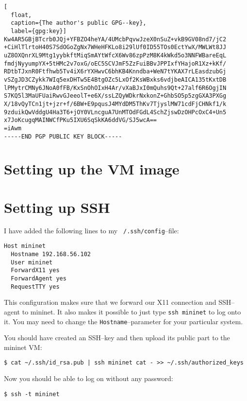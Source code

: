 \begin{lstlisting}[
  float,
  caption={The author's public GPG--key},
  label={gpg:key}]
Kw4AR5GBjBTcrb0JQj+YFBZO4heYA/4UMcbPqvwJzeX0nSuZ+vkB9GV08nd7/jC2
+CiHlTlrtoH40S7SdOGoZgNx7WHeHFKLo8i29lUf0ID55TOs0EctYwX/MWLWt8JJ
uZ8OXQnrXL9Mtg1yybkftMiqSmAYtWfcX6Wv86zpPzM8K4kWkd5o3NNFWBareEqL
fmdjNyyumpYX+5tHMc2v7oxG/oEC5SCVJmF5ZzFuiBBvJPPIxfYHajoR1Xz+kKf/
RDtbTJxnR0Ftfhwb5Tv4iX6rYXHwvC6bhKB4Knndba+WeN7tYKAX7rLEasdzubGj
vSZgJD3CZykk7WIq5exDHTw5E4BtgOZc5LxOf2KsWBxks6vdjbeAICA135tKxtDB
lPMytrCMNy6JNoA0fFB/KxSnOhOIxH4Ar/vXaBJxI0mQuhs9Qt+27alf6R6OgjIN
S7KQ5l3MaUFUaiRwvGJeeolT+e6X/ssLZQyWDkrNxkonZ+GhbSO5p5zgGXA3PXGg
X/18vQyTCn1jt+jzr+f/6BW+E9pqusJ4MYdDM5ThKv7TjyslMW71cdFjCHNkf1/k
9zduikQwVddgU4Ha3T6+jOY0VLncguA7UnMTOdFGdL4SchZjswDzOHPcOxC4+Un5
x7JoKcugqMAINWCfPKu5IXU6SqSkKA6ddVG/SJ5wcA==
=iAwm
-----END PGP PUBLIC KEY BLOCK-----
\end{lstlisting}
\clearpage %

\section{Setting up the VM image}


\section{Setting up SSH}

I have added the following lines to my \texttt{~/.ssh/config}--file:

\begin{verbatim}
Host mininet
  Hostname 192.168.56.102
  User mininet
  ForwardX11 yes
  ForwardAgent yes
  RequestTTY yes
\end{verbatim}

This configuration makes sure that we forward our X11 connection and
SSH--agent to mininet.  It also makes it possible to just type \texttt{ssh
mininet} to log onto it.  You may need to change the
\texttt{Hostname}--parameter for your particular system.

You should have created an SSH--key and then upload its public part to the
mininet VM:

\begin{verbatim}
$ cat ~/.ssh/id_rsa.pub | ssh mininet cat - >> ~/.ssh/authorized_keys
\end{verbatim}

Now you should be able to log on without any password:

\begin{verbatim}
$ ssh -t mininet
\end{verbatim}

